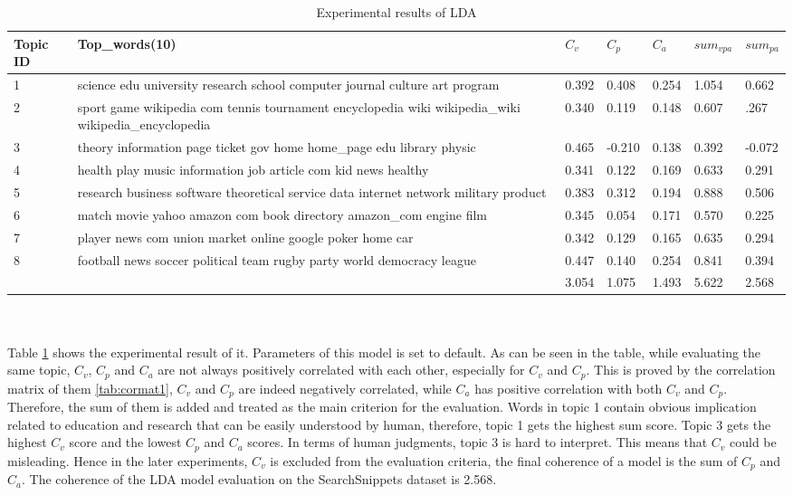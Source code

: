 \begin{table}[!htbp]
    \centering
    \hspace{0.5cm}
    \begin{tabular}{|p{45pt}|p{210pt}|p{30pt}|p{30pt}|p{30pt}|p{30pt}|p{30pt}|}
        \hline
        Topic ID & Top\_words(10) & $C_v$ & $C_p$ & $C_a$ & $sum_{vpa}$ & $sum_{pa}$\\ \hline
        1 & science edu university research school computer journal culture art program & 0.392 & 0.408 & 0.254 & 1.054 & 0.662\\\hline
        2 & sport game wikipedia com tennis tournament encyclopedia wiki wikipedia\_wiki wikipedia\_encyclopedia & 0.340 & 0.119 & 0.148 & 0.607 & .267 \\\hline
        3 & theory information page ticket gov home home\_page edu library physic & 0.465 & -0.210 & 0.138 & 0.392 & -0.072\\\hline
        4 & health play music information job article com kid news healthy & 0.341 & 0.122 & 0.169 & 0.633 & 0.291\\\hline
        5 & research business software theoretical service data internet network military product & 0.383 & 0.312 & 0.194 & 0.888 & 0.506\\\hline
        6 & match movie yahoo amazon com book directory amazon\_com engine film & 0.345 & 0.054 & 0.171 & 0.570 & 0.225\\\hline
        7 & player news com union market online google poker home car & 0.342 & 0.129 & 0.165 & 0.635 & 0.294 \\\hline
        8 & football news soccer political team rugby party world democracy league & 0.447 & 0.140 & 0.254 & 0.841 & 0.394 \\\hline
        & & 3.054 & 1.075 & 1.493 & 5.622 &2.568\\\hline
       
    \end{tabular}
    \caption{Experimental results of LDA}
    \label{tab:LDA1}
\end{table}
\\\\Table \ref{tab:LDA1} shows the experimental result of it. Parameters of this model is set to default. As can be seen in the table, while evaluating the same topic, $C_v$, $C_p$ and $C_a$ are not always positively correlated with each other, especially for $C_v$ and $C_p$. This is proved by the correlation matrix of them \ref{tab:cormat1}, $C_v$ and $C_p$ are indeed negatively correlated, while $C_a$ has positive correlation with both $C_v$ and $C_p$. Therefore, the sum of them is added and treated as the main criterion for the evaluation. Words in topic 1 contain obvious implication related to education and research that can be easily understood by human, therefore, topic 1 gets the highest sum score. Topic 3 gets the highest $C_v$ score and the lowest $C_p$ and $C_a$ scores. In terms of human judgments, topic 3 is hard to interpret. This means that $C_v$ could be misleading. Hence in the later experiments, $C_v$ is excluded from the evaluation criteria, the final coherence of a model is the sum of $C_p$ and $C_a$. The coherence of the LDA model evaluation on the SearchSnippets dataset is 2.568.
